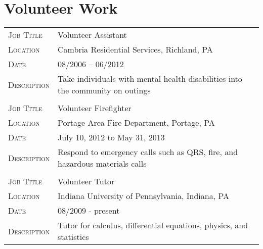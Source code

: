 \documentclass[10pt]{article}
\begin{document}
\section{Volunteer Work}
\begin{tabularx}{0.97\linewidth}{>{\raggedleft\scshape}p{3cm}X}
  Job Title    & Volunteer Assistant\\
  Location     & Cambria Residential Services, Richland, PA \\                                       
  Date         & 08/2006 -- 06/2012\\
  Description  & Take individuals with mental health disabilities into the community on outings\\
   & \\
  Job Title    & Volunteer Firefighter\\
  Location     & Portage Area Fire Department, Portage, PA\\
  Date         & July 10, 2012 to May 31, 2013\\
  Description  & Respond to emergency calls such as QRS, fire, and hazardous materials calls\\
              & \\ 
  Job Title    & Volunteer Tutor\\
  Location     & Indiana University of Pennsylvania, Indiana, PA\\
  Date         & 08/2009 - present\\
  Description  & Tutor for calculus, differential equations, physics, and statistics\\
\end{tabularx}

\end{document}
